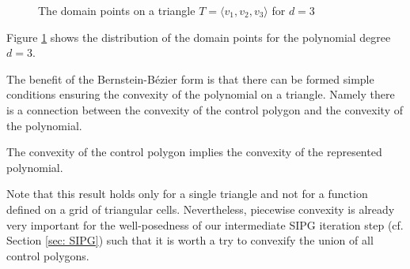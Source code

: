 \begin{figure}[h]
	\centering
	
	\caption{The domain points on a triangle $T=\langle v_1, v_2, v_3 \rangle$ for $d=3$}
	\label{fig: domain points}
\end{figure}
Figure \ref{fig: domain points} shows the distribution of the domain points for the polynomial degree $d=3$.

The benefit of the Bernstein-B\'ezier form is that there can be formed simple conditions ensuring the convexity of the polynomial on a triangle. Namely there is a connection between the convexity of the control polygon and the convexity of the polynomial.
\begin{theorem}
	The convexity of the control polygon implies the convexity of the represented polynomial.
\end{theorem}
Note that this result holds only for a single triangle and not for a function defined on a grid of triangular cells. Nevertheless, piecewise convexity is already very important for the well-posedness of our intermediate SIPG iteration step (cf. Section \ref{sec: SIPG}) such that it is worth a try to convexify the union of all control polygons.

